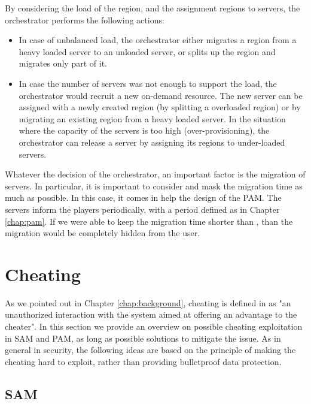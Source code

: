 \documentclass[final,10pt,a5paper]{phdimt}
\theoremstyle{definition}
\begin{document}
By considering the load of the region, and the assignment regions to servers, the orchestrator performs the following actions:

\begin{itemize}
\item In case of unbalanced load, the orchestrator either migrates a region from a heavy loaded server to an unloaded server, or splits up the region and migrates only part of it.
\item In case the number of servers was not enough to support the load, the orchestrator would recruit a new on-demand resource. The new server can be assigned with a newly created region (by splitting a overloaded region) or by migrating an existing region from a heavy loaded server. In the situation where the capacity of the servers is too high (over-provisioning), the orchestrator can release a server by assigning its regions to under-loaded servers.
\end{itemize}


Whatever the decision of the orchestrator, an important factor is the migration of servers.
In particular, it is important to consider and mask the migration time as much as possible.
In this case, it comes in help the design of the PAM.
The servers inform the players periodically, with a period defined as  in Chapter \ref{chap:pam}.
If we were able to keep the migration time shorter than , than the migration would be completely hidden from the user.




\section{Cheating}

As we pointed out in Chapter \ref{chap:background}, cheating is defined in \cite{Neumann2007} as "an unauthorized interaction with the system aimed at offering an advantage to the cheater".
In this section we provide an overview on possible cheating exploitation in SAM and PAM, as long as possible solutions to mitigate the issue. 
As in general in security, the following ideas are based on the principle of making the cheating hard to exploit, rather than providing bulletproof data protection.


\subsection{SAM}
\end{document}
